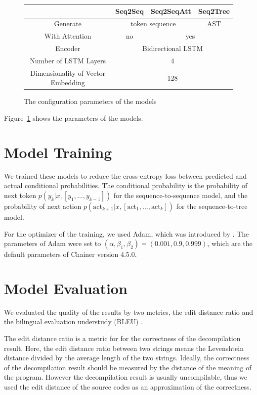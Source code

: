 \documentclass[senior,final,11pt]{iscs-thesis}
\begin{document}
\begin{figure}[t]
	\caption{The configuration parameters of the models}
	\begin{tabular}{|c||c|c|c|}
		\hline
		  & Seq2Seq & Seq2SeqAtt & Seq2Tree \\ \hline \hline
		 Generate & \multicolumn{2}{|c|}{token sequence} & AST \\ \hline
		 With Attention & no & \multicolumn{2}{|c|}{yes} \\ \hline
		 Encoder & \multicolumn{3}{|c|}{Bidirectional LSTM} \\ \hline
		Number of LSTM Layers & \multicolumn{3}{|c|}{4} \\ \hline
		Dimensionality of Vector Embedding & \multicolumn{3}{|c|}{128} \\ \hline
	\end{tabular}
	\label{fig:parameterofmodels}
\end{figure}

Figure~\ref{fig:parameterofmodels} shows the parameters of the models. 


\section{Model Training}
We trained these models to reduce the cross-entropy loss between predicted and actual conditional probabilities.
The conditional probability is the probability of next token $ p(y_k|x,[y_1,\dots,y_{k-1}]) $ for the sequence-to-sequence model, 
and the probability of next action $p(\mathrm{act}_{k+1}|x,[\mathrm{act}_1, \dots, \mathrm{act}_{k}]) $ for the sequence-to-tree model.

For the optimizer of the training, we used Adam, which was introduced by \citet{Adam}.
The parameters of Adam were set to $ (\alpha,\beta_1,\beta_2) = (0.001,0.9,0.999) $, which are the default parameters of Chainer version 4.5.0.

\section{Model Evaluation}
We evaluated the quality of the results by two metrics, 
the edit distance ratio and the bilingual evaluation understudy (BLEU) \citep{BLEU}.

The edit distance ratio is a metric for for the correctness of the decompilation result.
Here, the edit distance ratio between two strings means the Levenshtein distance \citep{levensthein_dist} divided by the average length of the two strings.
Ideally, the correctness of the decompilation result should be measured by the distance of the meaning of the program.
However the decompilation result is usually uncompilable, 
thus we used the edit distance of the source codes as an approximation of the correctness.
\end{document}
